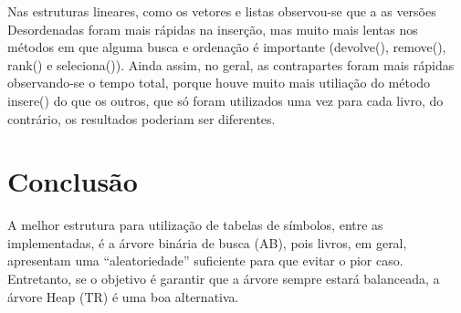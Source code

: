 \documentclass[a4paper]{article}
\begin{document}
Nas estruturas lineares, como os vetores e listas observou-se que a as versões Desordenadas foram mais rápidas na inserção, mas muito mais lentas nos métodos em que alguma busca e ordenação é importante (devolve(), remove(), rank() e seleciona()). Ainda assim, no geral, as contrapartes foram mais rápidas observando-se o tempo total, porque houve muito mais utiliação do método insere() do que os outros, que só foram utilizados uma vez para cada livro, do contrário, os resultados poderiam ser diferentes.

\section{Conclusão}
\label{sec:conclusao}

A melhor estrutura para utilização de tabelas de símbolos, entre as implementadas, é a árvore binária de busca (AB), pois livros, em geral, apresentam uma ``aleatoriedade'' suficiente para que evitar o pior caso. Entretanto, se o objetivo é garantir que a árvore sempre estará balanceada, a árvore Heap (TR) é uma boa alternativa.
\end{document}
